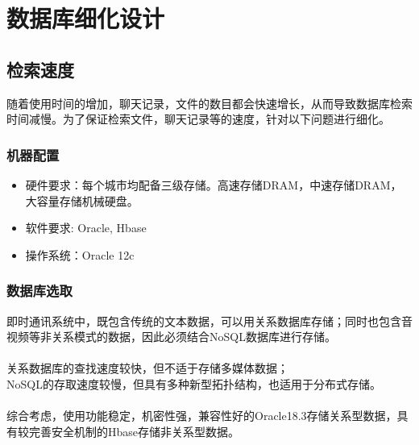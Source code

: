 \section{\color{red} 数据库细化设计}
{\color{red}

\subsection{\color{red} 检索速度}
随着使用时间的增加，聊天记录，文件的数目都会快速增长，从而导致数据库检索时间减慢。为了保证检索文件，聊天记录等的速度，针对以下问题进行细化。


\subsubsection{\color{red} 机器配置}
\begin{itemize}
    \item 硬件要求：每个城市均配备三级存储。高速存储DRAM，中速存储DRAM，大容量存储机械硬盘。
    \item 软件要求: Oracle, Hbase
    \item 操作系统：Oracle 12c
\end{itemize}
\subsubsection{\color{red} 数据库选取}
即时通讯系统中，既包含传统的文本数据，可以用关系数据库存储；同时也包含音视频等非关系模式的数据，因此必须结合NoSQL数据库进行存储。\\
\\
关系数据库的查找速度较快，但不适于存储多媒体数据；\\
NoSQL的存取速度较慢，但具有多种新型拓扑结构，也适用于分布式存储。\\
\\
综合考虑，使用功能稳定，机密性强，兼容性好的Oracle18.3存储关系型数据，具有较完善安全机制的Hbase存储非关系型数据。

}
